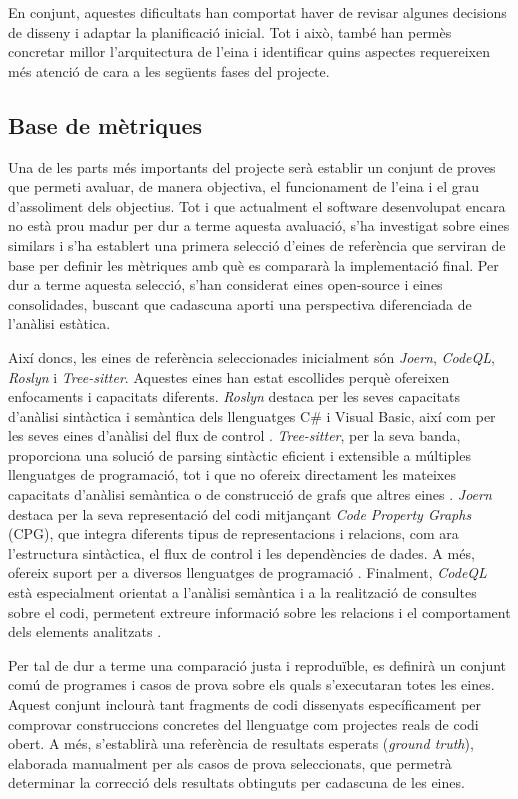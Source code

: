 En conjunt, aquestes dificultats han comportat haver de revisar algunes decisions de disseny i adaptar la planificació inicial. Tot i això, també han permès concretar millor l'arquitectura de l'eina i identificar quins aspectes requereixen més atenció de cara a les següents fases del projecte.

\subsection*{Base de mètriques}

Una de les parts més importants del projecte serà establir un conjunt de proves que permeti avaluar, de manera objectiva, el funcionament de l'eina i el grau d'assoliment dels objectius. Tot i que actualment el software desenvolupat encara no està prou madur per dur a terme aquesta avaluació, s'ha investigat sobre eines similars i s'ha establert una primera selecció d'eines de referència que serviran de base per definir les mètriques amb què es compararà la implementació final. Per dur a terme aquesta selecció, s'han considerat eines open-source i eines consolidades, buscant que cadascuna aporti una perspectiva diferenciada de l'anàlisi estàtica.

Així doncs, les eines de referència seleccionades inicialment són \textit{Joern}, \textit{CodeQL}, \textit{Roslyn} i \textit{Tree-sitter}. Aquestes eines han estat escollides perquè ofereixen enfocaments i capacitats diferents. \textit{Roslyn} destaca per les seves capacitats d'anàlisi sintàctica i semàntica dels llenguatges C\# i Visual Basic, així com per les seves eines d'anàlisi del flux de control \cite{roslyn_repo}. \textit{Tree-sitter}, per la seva banda, proporciona una solució de parsing sintàctic eficient i extensible a múltiples llenguatges de programació, tot i que no ofereix directament les mateixes capacitats d'anàlisi semàntica o de construcció de grafs que altres eines \cite{tree-sitter_repo}. \textit{Joern} destaca per la seva representació del codi mitjançant \textit{Code Property Graphs} (CPG), que integra diferents tipus de representacions i relacions, com ara l'estructura sintàctica, el flux de control i les dependències de dades. A més, ofereix suport per a diversos llenguatges de programació \cite{joern_repo}. Finalment, \textit{CodeQL} està especialment orientat a l'anàlisi semàntica i a la realització de consultes sobre el codi, permetent extreure informació sobre les relacions i el comportament dels elements analitzats \cite{codeql_repo}.

Per tal de dur a terme una comparació justa i reproduïble, es definirà un conjunt comú de programes i casos de prova sobre els quals s'executaran totes les eines. Aquest conjunt inclourà tant fragments de codi dissenyats específicament per comprovar construccions concretes del llenguatge com projectes reals de codi obert. A més, s'establirà una referència de resultats esperats (\textit{ground truth}), elaborada manualment per als casos de prova seleccionats, que permetrà determinar la correcció dels resultats obtinguts per cadascuna de les eines.

